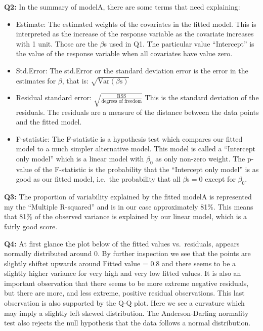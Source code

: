 \documentclass[]{article}
\begin{document}
\textbf{Q2:} In the summary of modelA, there are some terms that need
explaining:

\begin{itemize}
\item
  Estimate: The estimated weights of the covariates in the fitted model.
  This is interpreted as the increase of the response variable as the
  covariate increases with 1 unit. Those are the \(\beta\)s used in Q1.
  The particular value ``Intercept'' is the value of the response
  variable when all covariates have value zero.
\item
  Std.Error: The std.Error or the standard deviation error is the error
  in the estimates for \(\beta\), that is:
  \(\sqrt{\textrm{Var}(\beta\textrm{s})}\)
\item
  Residual standard error:
  \(\sqrt{\frac{\textrm{RSS}}{\textrm{degrees of freedom}}}\) This is
  the standard deviation of the residuals. The residuals are a measure
  of the distance between the data points and the fitted model.
\item
  F-statistic: The F-statistic is a hypothesis test which compares our
  fitted model to a much simpler alternative model. This model is called
  a ``Intercept only model'' which is a linear model with \(\beta_0\) as
  only non-zero weight. The p-value of the F-statistic is the
  probability that the ``Intercept only model'' is as good as our fitted
  model, i.e.~the probability that all \(\beta\)s\(=0\) except for
  \(\beta_0\).
\end{itemize}

\textbf{Q3:} The proportion of variability explained by the fitted
modelA is represented my the ``Multiple R-squared'' and is in our case
approximately 81\%. This means that 81\% of the observed variance is
explained by our linear model, which is a fairly good score.

\textbf{Q4:} At first glance the plot below of the fitted values
vs.~residuals, appears normally distributed around 0. By further
inspection we see that the points are slightly shiftet upwards around
Fitted value = 0.8 and there seems to be a slightly higher variance for
very high and very low fitted values. It is also an important
observation that there seems to be more extreme negative residuals, but
there are more, and less extreme, positive residual observations. This
last observation is also supported by the Q-Q plot. Here we see a
curvature which may imply a slightly left skewed distribution. The
Anderson-Darling normality test also rejects the null hypothesis that
the data follows a normal distribution.
\end{document}
